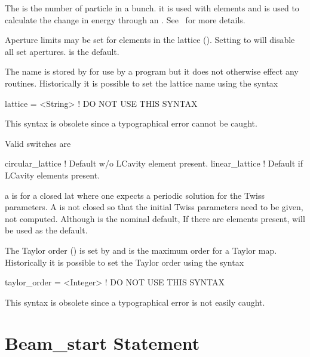 The  is the number of particle in a bunch.
it is used with  elements and is used to calculate the
change in energy through an . See~ for more
details.

Aperture limits may be set for elements in the lattice
(). Setting  to  will
disable all set apertures.  is the default.

The  name is stored by \bmad for use by a program but it does
not otherwise effect any \bmad routines. 
Historically it is possible to set the lattice name using the syntax
\begin{example}
  lattice = <String>   ! DO NOT USE THIS SYNTAX
\end{example}
This syntax is obsolete since a typographical error cannot be caught.

\noindent
{}
Valid  switches are
\begin{example}
  circular_lattice  ! Default w/o LCavity element present.
  linear_lattice    ! Default if LCavity elements present.
\end{example}
a  is for a closed lat where one expects a
periodic solution for the Twiss parameters. A  is
not closed so that the initial Twiss parameters need to be given, not
computed. Although  is the nominal default, If
there are  elements present,  will be used
as the default.

The Taylor order () is set by
 and is the maximum order for a Taylor map.
Historically it is possible to set the Taylor order using the syntax
\begin{example}
  taylor_order = <Integer>   ! DO NOT USE THIS SYNTAX
\end{example}
This syntax is obsolete since a typographical error is not easily caught.

\section{Beam_start Statement}
\label{s:beam-start}


